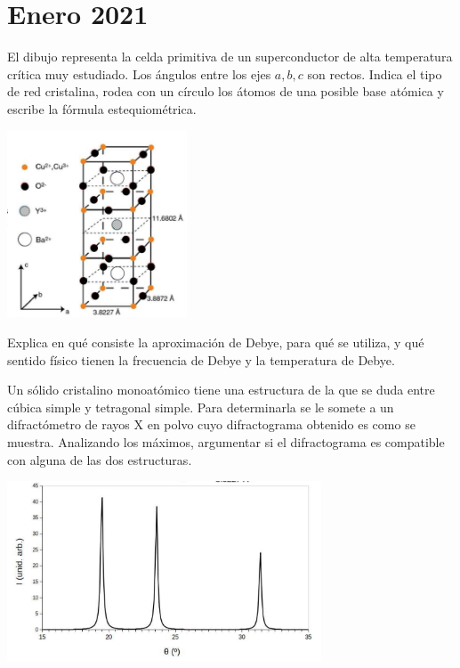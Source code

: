 \section{Enero 2021}
\setcounter{section}{2} %

\begin{ejercicio}
	El dibujo representa la celda primitiva de un superconductor de alta temperatura crítica muy estudiado. Los ángulos entre los ejes $a,b,c$ son rectos. Indica el tipo de red cristalina, rodea con un círculo los átomos de una posible base atómica y escribe la fórmula estequiométrica. 
	
	\begin{center}
		\includegraphics[width=0.4\textwidth]{Imagenes/Enero_2021_01.png}
	\end{center}
	
	
	
\end{ejercicio}

\begin{ejercicio}
	Explica en qué consiste la aproximación de Debye, para qué se utiliza, y qué sentido físico tienen la frecuencia de Debye y la temperatura de Debye.
\end{ejercicio}

\begin{ejercicio}
	Un sólido cristalino monoatómico tiene una estructura de la que se duda entre cúbica simple y tetragonal simple. Para determinarla se le somete a un difractómetro de rayos X en polvo cuyo difractograma obtenido es como se muestra. Analizando los máximos, argumentar si el difractograma es compatible con alguna de las dos estructuras.
	
	\begin{center}
		\includegraphics[width=0.70\textwidth]{Imagenes/Enero_2021_02.png}
	\end{center}
	
\end{ejercicio}

